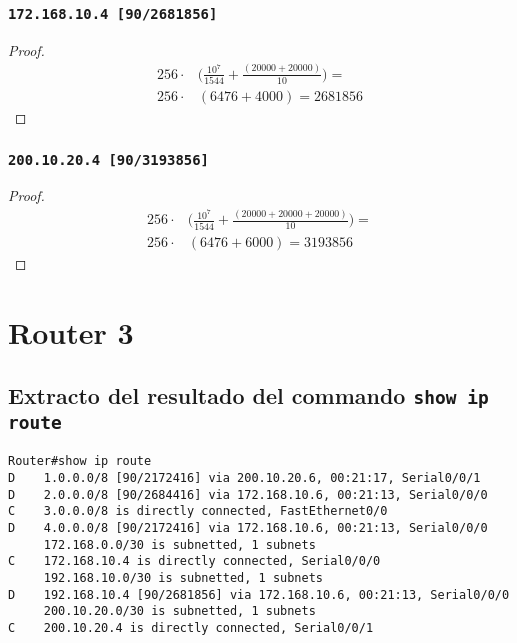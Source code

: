 \documentclass[12pt, times]{simauth}
\begin{document}
\begin{minipage}[t]{0.45\linewidth}  
\subsubsection{\texttt{172.168.10.4 [90/2681856]}}
\begin{proof}
    \begin{align*}
        256 \cdot & \bigg(\frac{10^7}{1544} + \frac{(20000 + 20000)}{10}\bigg) = \\
        256 \cdot & (6476 + 4000) = 2681856
    \end{align*}
\end{proof}
\subsubsection{\texttt{200.10.20.4 [90/3193856]}}
\begin{proof}
    \begin{align*}
        256 \cdot & \bigg(\frac{10^7}{1544} + \frac{(20000 + 20000 + 20000)}{10}\bigg) = \\
        256 \cdot & (6476 + 6000) = 3193856
    \end{align*}
\end{proof}
\end{minipage}


\newpage

\section{Router 3}
\subsection{Extracto del resultado del commando \texttt{show ip route}}

\begin{verbatim}
Router#show ip route
D    1.0.0.0/8 [90/2172416] via 200.10.20.6, 00:21:17, Serial0/0/1
D    2.0.0.0/8 [90/2684416] via 172.168.10.6, 00:21:13, Serial0/0/0
C    3.0.0.0/8 is directly connected, FastEthernet0/0
D    4.0.0.0/8 [90/2172416] via 172.168.10.6, 00:21:13, Serial0/0/0
     172.168.0.0/30 is subnetted, 1 subnets
C    172.168.10.4 is directly connected, Serial0/0/0
     192.168.10.0/30 is subnetted, 1 subnets
D    192.168.10.4 [90/2681856] via 172.168.10.6, 00:21:13, Serial0/0/0
     200.10.20.0/30 is subnetted, 1 subnets
C    200.10.20.4 is directly connected, Serial0/0/1 
\end{verbatim}
\end{document}
